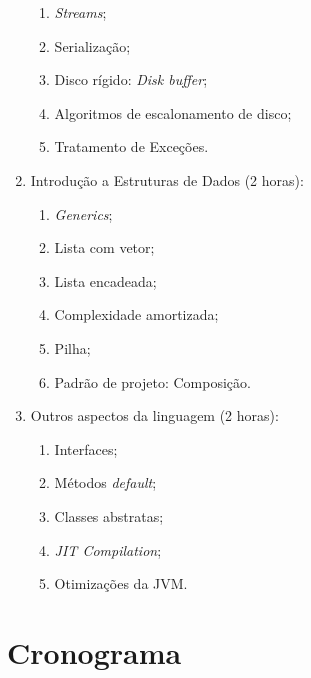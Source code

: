 \documentclass{article}
\begin{document}
\begin{enumerate}
\begin{samepage}
            \begin{enumerate}
                \item \textit{Streams};
                \item Serialização;
                \item Disco rígido: \textit{Disk buffer};
                \item Algoritmos de escalonamento de disco;
                \item Tratamento de Exceções.
            \end{enumerate}
        \end{samepage}
    \item Introdução a Estruturas de Dados (2 horas):
        \begin{samepage}
            \begin{enumerate}
                \item \textit{Generics};
                \item Lista com vetor;
                \item Lista encadeada;
                \item Complexidade amortizada;
                \item Pilha;
                \item Padrão de projeto: Composição.
            \end{enumerate}
        \end{samepage}
    \item Outros aspectos da linguagem (2 horas):
        \begin{samepage}
            \begin{enumerate}
                \item Interfaces;
                \item Métodos \textit{default};
                \item Classes abstratas;
                \item \textit{JIT Compilation};
                \item Otimizações da JVM\@.
            \end{enumerate}
        \end{samepage}
\end{enumerate}

\section{Cronograma}
\end{document}
